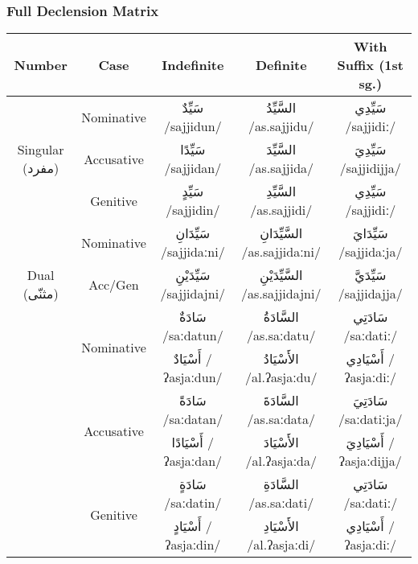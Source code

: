 \documentclass[letterpaper,12pt]{article}
\begin{document}
\subsubsection*{Full Declension Matrix}

\begin{tabular}{|c|c|c|c|c|}
\hline
\textbf{Number} & \textbf{Case} & \textbf{Indefinite} & \textbf{Definite} & \textbf{With Suffix (1st sg.)} \\
\hline
\multirow{3}{*}{Singular (\textarabic{مفرد})}
& Nominative & \textarabic{سَيِّدٌ} /sajjidun/ & \textarabic{السَّيِّدُ} /as.sajjidu/ & \textarabic{سَيِّدِي} /sajjidiː/ \\
& Accusative & \textarabic{سَيِّدًا} /sajjidan/ & \textarabic{السَّيِّدَ} /as.sajjida/ & \textarabic{سَيِّدِيَ} /sajjidijja/ \\
& Genitive & \textarabic{سَيِّدٍ} /sajjidin/ & \textarabic{السَّيِّدِ} /as.sajjidi/ & \textarabic{سَيِّدِي} /sajjidiː/ \\
\hline
\multirow{3}{*}{Dual (\textarabic{مثنّى})}
& Nominative & \textarabic{سَيِّدَانِ} /sajjidaːni/ & \textarabic{السَّيِّدَانِ} /as.sajjidaːni/ & \textarabic{سَيِّدَايَ} /sajjidaːja/ \\
& Acc/Gen & \textarabic{سَيِّدَيْنِ} /sajjidajni/ & \textarabic{السَّيِّدَيْنِ} /as.sajjidajni/ & \textarabic{سَيِّدَيَّ} /sajjidajja/ \\
\hline
\multirow{6}{*}{Plural (\textarabic{جمع})}
& \multirow{2}{*}{Nominative} & \textarabic{سَادَةٌ} /saːdatun/ & \textarabic{السَّادَةُ} /as.saːdatu/ & \textarabic{سَادَتِي} /saːdatiː/ \\
& & \textarabic{أَسْيَادٌ} /ʔasjaːdun/ & \textarabic{الأَسْيَادُ} /al.ʔasjaːdu/ & \textarabic{أَسْيَادِي} /ʔasjaːdiː/ \\
& \multirow{2}{*}{Accusative} & \textarabic{سَادَةً} /saːdatan/ & \textarabic{السَّادَةَ} /as.saːdata/ & \textarabic{سَادَتِيَ} /saːdatiːja/ \\
& & \textarabic{أَسْيَادًا} /ʔasjaːdan/ & \textarabic{الأَسْيَادَ} /al.ʔasjaːda/ & \textarabic{أَسْيَادِيَ} /ʔasjaːdijja/ \\
& \multirow{2}{*}{Genitive} & \textarabic{سَادَةٍ} /saːdatin/ & \textarabic{السَّادَةِ} /as.saːdati/ & \textarabic{سَادَتِي} /saːdatiː/ \\
& & \textarabic{أَسْيَادٍ} /ʔasjaːdin/ & \textarabic{الأَسْيَادِ} /al.ʔasjaːdi/ & \textarabic{أَسْيَادِي} /ʔasjaːdiː/ \\
\hline
\end{tabular}
\end{document}
